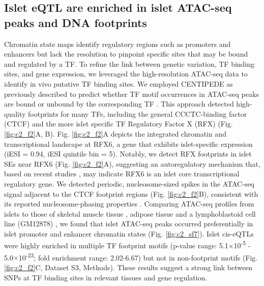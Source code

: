 \subsection{Islet eQTL are enriched in islet ATAC-seq peaks and DNA footprints}    
Chromatin state maps identify regulatory regions such as promoters and enhancers but lack the resolution to pinpoint specific sites that may be bound and regulated by a TF. To refine the link between genetic variation, TF binding sites, and gene expression, we leveraged the high-resolution ATAC-seq data to identify in vivo putative TF binding sites. We employed CENTIPEDE as previously described to predict whether TF motif occurrences in ATAC-seq peaks are bound or unbound by the corresponding TF \cite{scottGeneticRegulatorySignature2016, pique-regiAccurateInferenceTranscription2011}. This approach detected high-quality footprints for many TFs, including the general CCCTC-binding factor (CTCF) and the more islet specific TF Regulatory Factor X (RFX) (Fig. \ref{fig:c2_f2}A, B). Fig. \ref{fig:c2_f2}A depicts the integrated chromatin and transcriptional landscape at RFX6, a gene that exhibits islet-specific expression (iESI = 0.94, iESI quintile bin = 5). Notably, we detect RFX footprints in islet SEs near RFX6 (Fig. \ref{fig:c2_f2}A), suggesting an autoregulatory mechanism that, based on recent studies \cite{pasqualiPancreaticIsletEnhancer2014, saint-andreModelsHumanCore2016}, may indicate RFX6 is an islet core transcriptional regulatory gene. We detected periodic, nucleosome-sized spikes in the ATAC-seq signal adjacent to the CTCF footprint regions (Fig. \ref{fig:c2_f2}B), consistent with its reported nucleosome-phasing properties \cite{fuInsulatorBindingProtein2008}. Comparing ATAC-seq profiles from islets to those of skeletal muscle tissue \cite{scottGeneticRegulatorySignature2016}, adipose tissue \cite{allumCharacterizationFunctionalMethylomes2015} and a lymphoblastoid cell line (GM12878) \cite{buenrostroTranspositionNativeChromatin2013}, we found that islet ATAC-seq peaks occurred preferentially in islet promoter and enhancer chromatin states (Fig. \ref{fig:c2_sf7}). Islet cis-eQTLs were highly enriched in multiple TF footprint motifs (p-value range: 5.1$\times$10\textsuperscript{-5} - 5.0$\times$10\textsuperscript{-23}; fold enrichment range: 2.02-6.67) but not in non-footprint motifs (Fig. \ref{fig:c2_f2}C, Dataset S3, Methods). These results suggest a strong link between SNPs at TF binding sites in relevant tissues and gene regulation.

